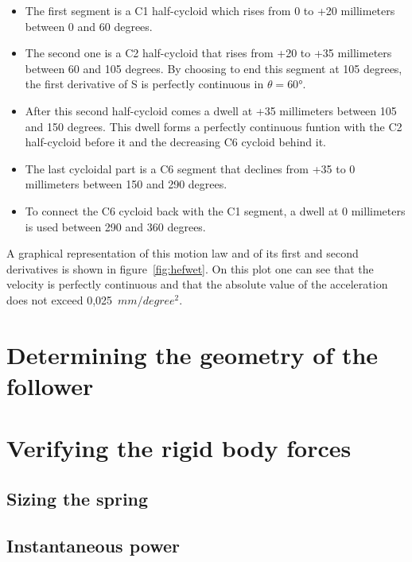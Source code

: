 \documentclass[a4paper]{article}
\begin{document}
\begin{itemize}

\item The first segment is a C1 half-cycloid which rises from 0 to +20 millimeters between 0 and 60 degrees. 

\item The second one is a C2 half-cycloid that rises from +20 to +35 millimeters between 60 and 105 degrees. By choosing to end this segment at 105 degrees, the first derivative of S is perfectly continuous in \(\theta=60°\).

\item After this second half-cycloid comes a dwell at +35 millimeters between 105 and 150 degrees. This dwell forms a perfectly continuous funtion with the C2 half-cycloid before it and the decreasing C6 cycloid behind it.

\item The last cycloidal part is a C6 segment that declines from +35 to 0 millimeters between 150 and 290 degrees.

\item To connect the C6 cycloid back with the C1 segment, a dwell at 0 millimeters is used between 290 and 360 degrees.

\end{itemize}

A graphical representation of this motion law and of its first and second derivatives is shown in figure~\ref{fig:hefwet}. On this plot one can see that the velocity is perfectly continuous and that the absolute value of the acceleration does not exceed 0,025~\(\si{mm/degree^2}\).




\section{Determining the geometry of the follower}
\label{sec:2}

\section{Verifying the rigid body forces}

\subsection{Sizing the spring}

\subsection{Instantaneous power}
\end{document}
